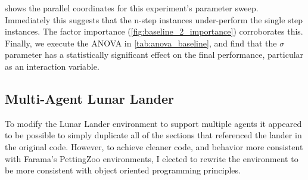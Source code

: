 \documentclass[12pt,letterpaper]{exam}
\begin{document}
\begin{questions}
	 shows the parallel coordinates for this 
	experiment's parameter sweep. Immediately this suggests that 
	the n-step instances under-perform the single step instances.
	The factor importance (\cref{fig:baseline_2_importance}) corroborates this.
	Finally, we execute the ANOVA in \cref{tab:anova_baseline},
	and find that the \(\sigma\) parameter has a statistically significant
	effect on the final performance, particular as an interaction variable.
\end{questions}

\subsection*{Multi-Agent Lunar Lander}
\label{sec:ma-lander}

To modify the Lunar Lander environment to support multiple 
agents it appeared to be possible to simply duplicate all of the
sections that referenced the lander in the original code.
However, to achieve cleaner code, and behavior more consistent with 
Farama's PettingZoo environments, I elected to rewrite the environment
to be more consistent with object oriented programming principles.
\end{document}
